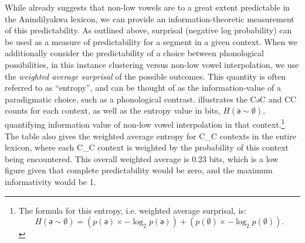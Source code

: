 \documentclass[output=paper,colorlinks,citecolor=brown]{langscibook}
\begin{document}
While  already suggests that non-low vowels are to a great extent predictable in the Anindilyakwa lexicon, we can provide an information-theoretic measurement of this predictability. As outlined above, surprisal (negative log probability) can be used as a measure of predictability for a segment in a given context. When we additionally consider the predictability of a choice between phonological possibilities, in this instance clustering versus non-low vowel interpolation, we use the \textit{weighted average surprisal} of the possible outcomes. This quantity is often referred to as “entropy”, and can be thought of as the information\hyp value of a paradigmatic choice, such as a phonological contrast.   illustrates the CəC and \textsc{CC} counts for each context, as well as the entropy value in bits, $H(\text{ə}\sim\emptyset)$, quantifying information value of non-low vowel interpolation in that context.\footnote{The formula for this entropy, i.e. weighted average surprisal, is:
\[
H(\text{ə}\sim\emptyset) = (p(\text{ə}) \times -\log_2 p(\text{ə})) + (p(\emptyset) \times -\log_2 p(\emptyset)).
\]}
The table also gives the weighted average entropy for \textsc{C\_C} contexts in the entire lexicon, where each \textsc{C\_C} context is weighted by the probability of this context being encountered. This overall weighted average is 0.23 bits, which is a low figure given that complete predictability would be zero, and the maximum informativity would be 1. %
\end{document}
